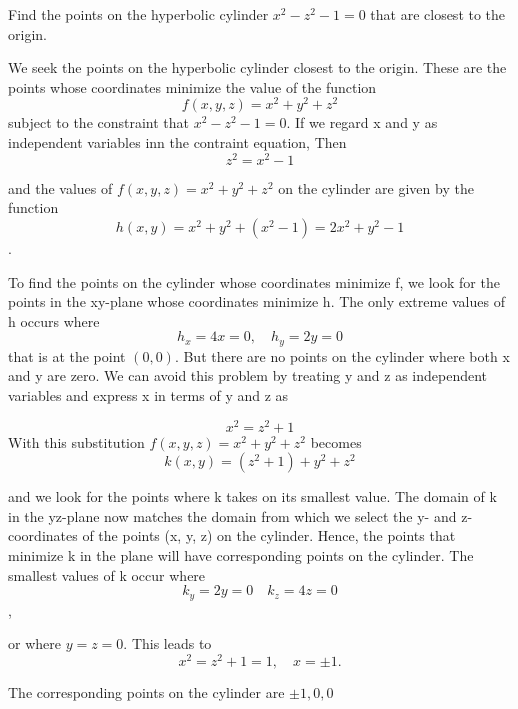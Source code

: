 \documentclass[12pt,a4paper]{article}
\begin{document}
\begin{example}
    Find the points on the hyperbolic cylinder \(x^2 - z^2 -1 = 0\) that are closest to the origin.

    \begin{solution}
        We seek the points on the hyperbolic cylinder closest to the origin. These are the points whose coordinates minimize the value of the function
        \[f(x,y,z) = x^2 + y^2 + z^2\]
        subject to the constraint that \(x^2 - z^2 -1 = 0\). If we regard x and y as independent variables inn the contraint equation, Then
        \[z^2 = x^2 -1\]

        and the values of \(f(x,y,z) = x^2 + y^2 + z^2 \) on the cylinder are given by the function
         \[h(x,y) = x^2 + y^2 + (x^2 -1) = 2x^2 + y^2 -1\].

         To find the points on the cylinder whose coordinates minimize f, we look for the points in the xy-plane whose coordinates minimize h. The only extreme values of h occurs where
         \[h_x = 4x = 0, \quad h_y = 2y = 0\]
         that is at the point \((0,0)\). But there are no points on the cylinder where both x and y are zero. We can avoid this problem by treating y  and z as independent variables and express x in terms of y and z as

          \[x^2 = z^2 +1\]
          With this substitution \(f(x,y,z) = x^2 + y^2 + z^2 \) becomes 
          \[k(x,y) = (z^2 +1) + y^2 + z^2 \]

          and we look for the points where k takes on its smallest value. The domain of k in the yz-plane now matches the domain from which we select the y- and z-coordinates of the points (x, y, z) on the cylinder. Hence, the points that minimize k in the plane will have corresponding points on the cylinder. The smallest values of k occur where
          \[k_y = 2y = 0 \quad k_z = 4z = 0\],

          or where \(y = z = 0\). This leads to 
          \[x^2 = z^2 +1 = 1, \quad x = \pm 1.\]

          The corresponding points on the cylinder are \(\pm 1, 0, 0\)


\end{solution}
\end{example}
\end{document}
